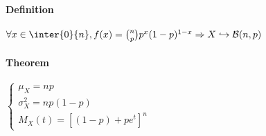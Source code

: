 \paragraph{Definition}
\begin{center}
$\forall x\in \inter{0}{n}, f(x)= {n\choose p} p^{x}(1-p)^{1-x}\Rightarrow X\hookrightarrow\mathcal{B}(n,p)$
\end{center}
\paragraph{Theorem}
\begin{center}
$\begin{cases}
	\mu_{X}=np\\
	\sigma_{X}^{2} = np(1-p)\\
	M_{X}(t)=[(1-p)+pe^{t}]^{n}
\end{cases}$
\end{center}

